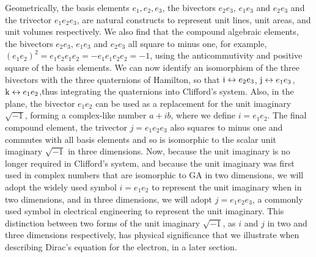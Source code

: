 \documentclass[prb,preprint]{revtex4}
\newcommand{\iGA}{{j}}
\newcommand{\iGAT}{{i}}
\begin{document}
Geometrically, the basis elements $ e_1, e_2,e_3 $, the bivectors $ e_2 e_3 $, $ e_1 e_3 $ and $ e_2 e_3 $ and the trivector $ e_1 e_2 e_3 $, are natural constructs to represent unit lines, unit areas, and unit volumes respectively.
We also find that the compound algebraic elements, the bivectors $ e_2 e_3 $, $ e_1 e_3 $ and $ e_2 e_3 $ all square to minus one, for example, $ (e_1 e_2)^2 = e_1 e_2 e_1 e_2 = -e_1 e_1 e_2 e_2 = -1 $, using the anticommutivity and positive square of the basis elements.  We can now identify an isomorphism of the three bivectors with the three quaternions of Hamilton, so that $ {\rm{i}} \leftrightarrow e_2 e_3 $, $ {\rm{j}} \leftrightarrow e_1 e_3 $, $ {\rm{k}} \leftrightarrow e_1 e_2 $,thus integrating the quaternions into Clifford's system. Also, in the plane, the bivector $ e_1 e_2 $ can be used as a replacement for the unit imaginary $ \sqrt{-1} $, forming a complex-like number $ a + i b $, where we define $ \iGAT = e_1 e_2 $.
The final compound element, the trivector $ \iGA = e_1 e_2 e_3 $ also squares to minus one and commutes with all basis elements and so is isomorphic to the scalar unit imaginary $ \sqrt{-1} $ in three dimensions.  Now, because the unit imaginary is no longer required in Clifford's system, and because the unit imaginary was first used in complex numbers that are isomorphic to GA in two dimensions, we will adopt the widely used symbol $ \iGAT = e_1 e_2 $ to represent the unit imaginary when in two dimensions, and in three dimensions, we will adopt $ \iGA = e_1 e_2 e_3 $, a commonly used symbol in electrical engineering to represent the unit imaginary. This distinction between two forms of the unit imaginary $ \sqrt{-1} $, as $ \iGAT $ and $ \iGA $ in two and three dimensions respectively, has physical significance that we illustrate when describing Dirac's equation for the electron, in a later section.
\end{document}
